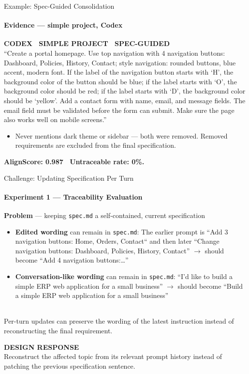 \documentclass[aspectratio=169,11pt,c]{beamer}
\newcommand{\quotewho}[1]{{\footnotesize\bfseries\color{accentorange}\MakeUppercase{#1}}\\[2pt]}
\newcommand{\calllbl}[1]{{\footnotesize\bfseries\color{primaryblue}\MakeUppercase{#1}}\\[2pt]}
\begin{document}
\begin{frame}{Example: Spec-Guided Consolidation}
  \framesubtitle{Evidence --- simple project, Codex}
  \begin{quotebox}
    \footnotesize\quotewho{Codex \textperiodcentered\ Simple project \textperiodcentered\ Spec-guided}
    ``Create a portal homepage. Use top navigation with 4 navigation buttons: Dashboard, Policies, History, Contact; style navigation: rounded buttons, blue accent, modern font. If the label of the navigation button starts with `H', the background color of the button should be blue; if the label starts with `O', the background color should be red; if the label starts with `D', the background color should be `yellow'. Add a contact form with name, email, and message fields. The email field must be validated before the form can submit. Make sure the page also works well on mobile screens.''
  \end{quotebox}
  \begin{itemize}
    \item Never mentions dark theme or sidebar --- both were removed. Removed requirements are excluded from the final specification.
  \end{itemize}
  \begin{calloutbox}
    \textbf{AlignScore: 0.987 \textperiodcentered\ Untraceable rate: 0\%.}
  \end{calloutbox}
\end{frame}

\begin{frame}{Challenge: Updating Specification Per Turn}
  \framesubtitle{Experiment 1 --- Traceability Evaluation}
  {\small\bfseries\color{primaryblue}Problem} --- keeping \texttt{spec.md} a self-contained, current specification
  \begin{itemize}\scriptsize
    \item \textbf{Edited wording} can remain in \texttt{spec.md}: The earlier prompt is ``Add 3 navigation buttons: Home, Orders, Contact`` and then later ``Change navigation buttons: Dashboard, Policies, History, Contact'' $\to$ should become ``Add 4 navigation buttons:\dots''
    \item \textbf{Conversation-like wording} can remain in \texttt{spec.md}: ``I'd like to build a simple ERP web application for a small business'' $\to$ should become ``Build a simple ERP web application for a small
    business''
  \end{itemize}
  \vspace{2pt}
  {\scriptsize\color{midgray}\calllbl{Why it happens} Per-turn updates can preserve the wording of the latest instruction instead of reconstructing the final requirement.\par}
  \vspace{2pt}
  \begin{calloutbox}
    \scriptsize\calllbl{Design response} Reconstruct the affected topic from its relevant prompt history instead of patching the previous specification sentence.
  \end{calloutbox}
  \vspace{2pt}
\end{frame}
\end{document}

